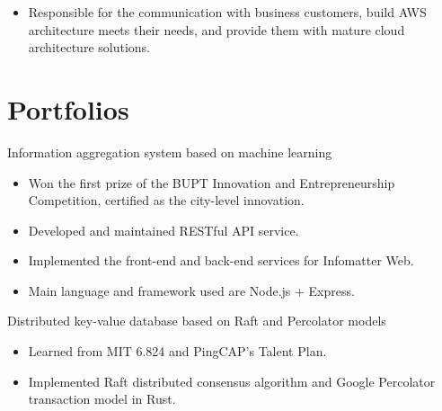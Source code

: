\documentclass{resume}
\newcommand{\en}[1]{#1}
\newcommand{\zh}[1]{}
\begin{document}
\en{}
\zh{\datedsubsection{\textbf{\href{https://www.amazonaws.cn/}{亚马逊 AWS 中国（AWS China Inc.）}}}{2020/05 -- 2020/06}}
\en{}
\zh{\role{解决方案架构}{解决方案架构师实习}}
\begin{itemize}
      \item \en{Responsible for the communication with business customers, build AWS architecture meets their needs, and provide them with mature cloud architecture solutions.}
            \zh{负责 ToB 客户的技术接洽沟通，搭建符合其需求的 AWS 产品架构，为客户提供成熟的云架构解决方案}
\end{itemize}

\section{\en{Portfolios}\zh{个人项目}}
\en{Information aggregation system based on machine learning}
\zh{基于机器学习的信息聚合系统}
\begin{itemize}
      \item \en{Won the first prize of the BUPT Innovation and Entrepreneurship Competition, certified as the city-level innovation.}
            \zh{项目荣获北京邮电大学创新创业大赛一等奖，通过北京市级高等院校大创项目认定}
      \item \en{Developed and maintained RESTful API service.}
            \zh{开发维护相关 RESTful API 服务}
      \item \en{Implemented the front-end and back-end services for Infomatter Web.}
            \zh{实现了 Infomatter Web 版的前后端服务}
      \item \en{Main language and framework used are Node.js + Express.}
            \zh{语言和框架为 Node.js + Express}
\end{itemize}

\en{Distributed key-value database based on Raft and Percolator models}
\zh{基于 Raft 与 Percolator 模型的分布式键值数据库}
\begin{itemize}
      \item \en{Learned from MIT 6.824 and PingCAP's Talent Plan.}
            \zh{学习 MIT 6.824 和 PingCAP Talent Plan 后完成}
      \item \en{Implemented Raft distributed consensus algorithm and Google Percolator transaction model in Rust.}
            \zh{使用 Rust 开发，基于 Raft 分布式共识算法和 Google Percolator 事务模型实现}
\end{itemize}
\end{document}
